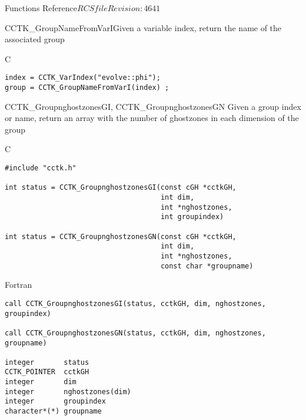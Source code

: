 \begin{cactuspart}{ Functions Reference}{$RCSfile$}{$Revision: 4641 $}
\begin{FunctionDescription}{CCTK\_GroupNameFromVarI}{Given a variable index, return the name of the associated group}
\begin{ExampleSection}
\begin{Example}{C}
\begin{verbatim}
index = CCTK_VarIndex("evolve::phi");
group = CCTK_GroupNameFromVarI(index) ;
\end{verbatim}
\end{Example}
\end{ExampleSection}
\end{FunctionDescription}



\begin{FunctionDescription}{CCTK\_GroupnghostzonesGI, CCTK\_GroupnghostzonesGN}
\label{CCTK-GroupnghostzonesGI}
\label{CCTK-GroupnghostzonesGN}
  Given a group index or name, return an array with the number of ghostzones in each dimension of the group
\begin{SynopsisSection}
\begin{Synopsis}{C}
\begin{verbatim}
#include "cctk.h"

int status = CCTK_GroupnghostzonesGI(const cGH *cctkGH,
                                     int dim,
                                     int *nghostzones,
                                     int groupindex)

int status = CCTK_GroupnghostzonesGN(const cGH *cctkGH,
                                     int dim,
                                     int *nghostzones,
                                     const char *groupname)
\end{verbatim}
\end{Synopsis}
\begin{Synopsis}{Fortran}
\begin{verbatim}
call CCTK_GroupnghostzonesGI(status, cctkGH, dim, nghostzones, groupindex)

call CCTK_GroupnghostzonesGN(status, cctkGH, dim, nghostzones, groupname)

integer       status
CCTK_POINTER  cctkGH
integer       dim
integer       nghostzones(dim)
integer       groupindex
character*(*) groupname
\end{verbatim}
\end{Synopsis}
\end{SynopsisSection}


\end{FunctionDescription}
\end{cactuspart}
